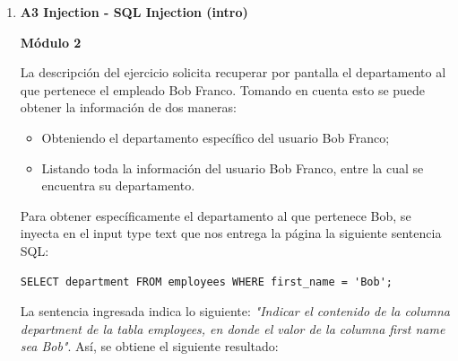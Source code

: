 \documentclass[12pt,oneside,a4paper]{book}
\begin{document}
\begin{enumerate}
    \begin{enumerate}
        
        \item{\textbf{A3 Injection - SQL Injection (intro)}}
       
        \vspace{1em}

        \textbf{Módulo 2}
        
        \vspace{1em}

        \hspace{20pt}
        La descripción del ejercicio solicita recuperar por pantalla el departamento al que pertenece el empleado Bob Franco. Tomando en cuenta esto se puede obtener la información de dos maneras:

        \vspace{1em}

            \begin{itemize}
                \item Obteniendo el departamento específico del usuario Bob Franco;
                \item Listando toda la información del usuario Bob Franco, entre la cual se encuentra su departamento.
            \end{itemize}

        \vspace{1em}

        \hspace{20pt}
        Para obtener específicamente el departamento al que pertenece Bob, se inyecta en el input type text que nos entrega la página la siguiente sentencia SQL:

        \vspace{1em}

        \begin{verbatim}
SELECT department FROM employees WHERE first_name = 'Bob';
        \end{verbatim}
        
        \hspace{20pt}
        La sentencia ingresada indica lo siguiente: \textit{"Indicar el contenido de la columna \textit{department} de la tabla \textit{employees}, en donde el valor de la columna \textit{first name} sea Bob"}. Así, se obtiene el siguiente resultado:


\end{enumerate}
\end{enumerate}
\end{document}
